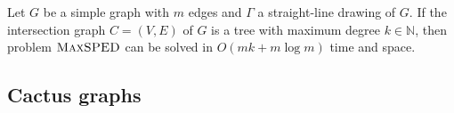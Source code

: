 \documentclass[a4paper,english,numberwithinsect]{eurocg18}
\newcommand{\maxsped}{\ensuremath{\textsc{MaxSPED}}\xspace}
\newcommand{\sollong}{\ensuremath{\textit{long}}\xspace}
\newcommand{\solshort}{\ensuremath{\textit{short}}\xspace}
\begin{document}
\begin{theorem}
	\label{thm:tree}
	Let $ G $ be a simple graph with $m$ edges and $ \Gamma $ a straight-line drawing of $ G $. If the intersection graph $ C = (V,E) $ of $ G $ is a tree with maximum degree $ k \in \mathbb{N} $, then problem \maxsped can be solved in $ O(mk + m \log m) $ time and space.
\end{theorem}
%
%
%


\subsection{Cactus graphs}
\label{sec:cactus}
\end{document}
